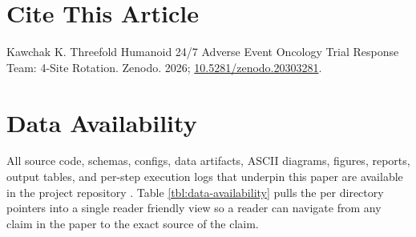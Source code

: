 {}
\section*{Cite This Article}

Kawchak K. Threefold Humanoid 24/7 Adverse Event Oncology Trial Response Team: 4-Site Rotation. Zenodo. 2026;
\href{https://doi.org/10.5281/zenodo.20303281}{10.5281/zenodo.20303281}.

{}
\section*{Data Availability}

All source code, schemas, configs, data artifacts, ASCII diagrams,
figures, reports, output tables, and per-step execution logs that
underpin this paper are available in the project repository
\cite{kawchak_2026_clinical_ai_demos_repo}. Table
\ref{tbl:data-availability} pulls the per directory pointers into a
single reader friendly view so a reader can navigate from any claim
in the paper to the exact source of the claim.

\clearpage


